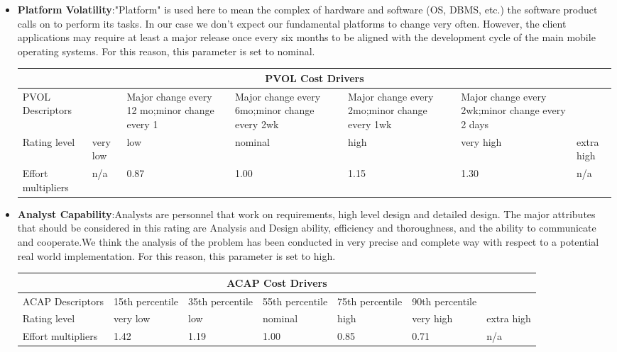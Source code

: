 \begin{itemize}
\item \textbf{Platform Volatility}:"Platform" is used here to mean the complex of hardware and software (OS, DBMS, etc.) the software product calls on to perform its tasks. In our case we don’t expect our fundamental platforms to change very often. However, the client applications may require at least a major release once every six months to be aligned with the development cycle of the main mobile operating systems. For this reason, this parameter is set to nominal.

\begin{longtable}{| m{}| m{} | m{} | m{} | m{} | m{} | m{}| }
\hline
\multicolumn{7}{c}{PVOL Cost Drivers}\\
\hline
\hline
PVOL Descriptors &  & Major change every 12 mo;minor change every 1 & Major change every 6mo;minor change every 2wk & Major change every 2mo;minor change every 1wk & Major change every 2wk;minor change every 2 days & \\
\hline
Rating level & very low & low & nominal & high & very high & extra high \\
\hline
Effort multipliers & n/a & 0.87 & 1.00 & 1.15 & 1.30 & n/a \\
\hline
\end{longtable}

\item\textbf{Analyst Capability}:Analysts are personnel that work on requirements, high level design and detailed design. The major attributes that should be considered in this rating are Analysis and Design ability, efficiency and thoroughness, and the ability to communicate and cooperate.We think the analysis of the problem has been conducted in very precise and complete way with respect to a potential real world
implementation. For this reason, this parameter is set to high.

\begin{longtable}{| m{}| m{} | m{} | m{} | m{} | m{} | m{}| }
\hline
\multicolumn{7}{c}{ACAP Cost Drivers}\\
\hline
\hline
ACAP Descriptors & 15th percentile  & 35th percentile & 55th percentile & 75th percentile & 90th percentile & \\
\hline
Rating level & very low & low & nominal & high & very high & extra high \\
\hline
Effort multipliers & 1.42 & 1.19 & 1.00 & 0.85 & 0.71 & n/a \\
\hline
\end{longtable}


\end{itemize}
